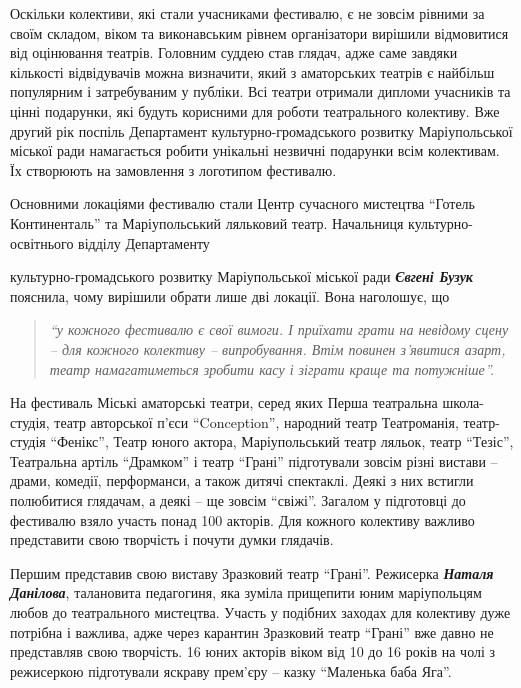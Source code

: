 Оскільки колективи, які стали учасниками фестивалю, є не зовсім рівними за
своїм складом, віком та виконавським рівнем організатори вирішили відмовитися
від оцінювання театрів. Головним суддею став глядач, адже саме завдяки
кількості відвідувачів можна визначити, який з аматорських театрів є найбільш
популярним і затребуваним у публіки. Всі театри отримали дипломи учасників та
цінні подарунки, які будуть корисними для роботи театрального колективу. Вже
другий рік поспіль Департамент культурно-громадського розвитку Маріупольської
міської ради намагається робити унікальні незвичні подарунки всім колективам.
Їх створюють на замовлення з логотипом фестивалю.

Основними локаціями фестивалю стали Центр сучасного мистецтва \enquote{Готель
Континенталь} та Маріупольський ляльковий театр. Начальниця
культурно-освітнього відділу Департаменту\par\noindent культурно-громадського розвитку
Маріупольської міської ради \emph{\textbf{Євгені Бузук}} пояснила, чому вирішили обрати лише
дві локації. Вона наголошує, що

\begin{quote}
\em\enquote{у кожного фестивалю є свої вимоги. І приїхати
грати на невідому сцену – для кожного колективу – випробування. Втім повинен
з'явитися азарт, театр намагатиметься зробити касу і зіграти краще та
потужніше}.
\end{quote}

На фестиваль Міські аматорські театри, серед яких Перша театральна
школа-студія, театр авторської п'єси  \enquote{Conception}, народний театр Театроманія,
театр-студія \enquote{Фенікс}, Театр юного актора, Маріупольський театр ляльок, театр
\enquote{Тезіс}, Театральна артіль \enquote{Драмком} і театр \enquote{Грані} підготували зовсім різні
вистави – драми, комедії, перформанси, а також дитячі спектаклі. Деякі з них
встигли полюбитися глядачам, а деякі – ще зовсім \enquote{свіжі}. Загалом у підготовці
до фестивалю взяло участь понад 100 акторів. Для кожного колективу важливо
представити свою творчість і почути думки глядачів.

Першим представив свою виставу Зразковий театр \enquote{Грані}. Режисерка \emph{\textbf{Наталя
Данілова}}, талановита педагогиня, яка зуміла прищепити юним маріупольцям любов
до театрального мистецтва. Участь у подібних заходах для колективу дуже
потрібна і важлива, адже через карантин Зразковий театр \enquote{Грані} вже давно не
представляв свою творчість. 16 юних акторів віком від 10 до 16 років на чолі з
режисеркою підготували яскраву прем'єру – казку \enquote{Маленька баба Яга}.

